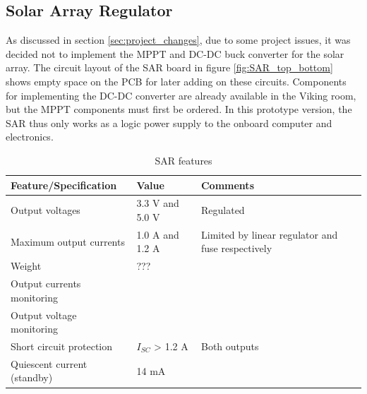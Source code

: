 \subsection{Solar Array Regulator}
%
%
As discussed in section \ref{sec:project_changes}, due to some project issues, it was decided not to implement the \ac{MPPT} and DC-DC buck converter for the solar array. The circuit layout of the \ac{SAR} board in  figure \ref{fig:SAR_top_bottom} shows empty space on the \ac{PCB} for later adding on these circuits. Components for implementing the DC-DC converter are already available in the Viking room, but the \ac{MPPT} components must first be ordered.
%
%
In this prototype version, the \ac{SAR} thus only works as a logic power supply to the onboard computer and electronics.
%
%
\begin{table}[H]
\centering
\caption{\ac{SAR} features}
\label{tab:BCR_features}
\begin{tabular}{p{}p{}p{}}
\hline
\textbf{Feature/Specification} & \textbf{Value} & \textbf{Comments}\\
\hline
Output voltages & 3.3 V and 5.0 V & Regulated \\
Maximum output currents & 1.0 A and 1.2 A & Limited by linear regulator and fuse respectively \\
Weight & ??? & \\
Output currents monitoring & & \\
Output voltage monitoring & & \\
Short circuit protection & $I_{SC}$ > 1.2 A & Both outputs \\
Quiescent current (standby) & 14 mA & \\
\hline
\end{tabular}
\end{table} 
%
%
